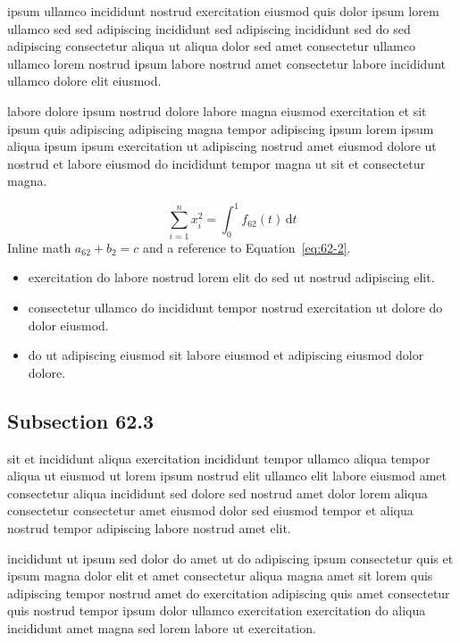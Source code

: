 \documentclass{article}
\begin{document}
ipsum ullamco incididunt nostrud exercitation eiusmod quis dolor ipsum lorem ullamco sed sed adipiscing incididunt sed adipiscing incididunt sed do sed adipiscing consectetur aliqua ut aliqua dolor sed amet consectetur ullamco ullamco lorem nostrud ipsum labore nostrud amet consectetur labore incididunt ullamco dolore elit eiusmod.

labore dolore ipsum nostrud dolore labore magna eiusmod exercitation et sit ipsum quis adipiscing adipiscing magna tempor adipiscing ipsum lorem ipsum aliqua ipsum ipsum exercitation ut adipiscing nostrud amet eiusmod dolore ut nostrud et labore eiusmod do incididunt tempor magna ut sit et consectetur magna.

\begin{equation}\label{eq:62-2}
  \sum_{i=1}^{n} x_i^{2} = \int_0^1 f_{62}(t)\,\mathrm{d}t
\end{equation}
Inline math $a_{62} + b_{2} = c$ and a reference to Equation~\eqref{eq:62-2}.

\begin{itemize}
  \item exercitation do labore nostrud lorem elit do sed ut nostrud adipiscing elit.
  \item consectetur ullamco do incididunt tempor nostrud exercitation ut dolore do dolor eiusmod.
  \item do ut adipiscing eiusmod sit labore eiusmod et adipiscing eiusmod dolor dolore.
\end{itemize}

\subsection{Subsection 62.3}\label{sec:62-3}
sit et incididunt aliqua exercitation incididunt tempor ullamco aliqua tempor aliqua ut eiusmod ut lorem ipsum nostrud elit ullamco elit labore eiusmod amet consectetur aliqua incididunt sed dolore sed nostrud amet dolor lorem aliqua consectetur consectetur amet eiusmod dolor sed eiusmod tempor et aliqua nostrud tempor adipiscing labore nostrud amet elit.

incididunt ut ipsum sed dolor do amet ut do adipiscing ipsum consectetur quis et ipsum magna dolor elit et amet consectetur aliqua magna amet sit lorem quis adipiscing tempor nostrud amet do exercitation adipiscing quis amet consectetur quis nostrud tempor ipsum dolor ullamco exercitation exercitation do aliqua incididunt amet magna sed lorem labore ut exercitation.
\end{document}
